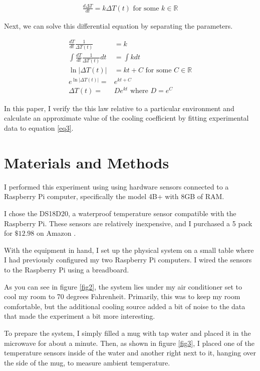 \documentclass[12pt]{article}
\newcommand{\reals}{\mathbb{R}}
\begin{document}
\begin{align} \label{eq1}
	\frac{d\Delta T}{dt} = k\Delta T(t) \textrm{ for some $k \in \reals$}
\end{align}

Next, we can solve this differential equation by separating the parameters.

\begin{align} \label{eq2}
	\frac{dT}{dt}\frac{1}{\Delta T(t)} & = k \\
	\int \frac{dT}{dt}\frac{1}{\Delta T(t)} dt & = \int k dt \\
	\ln|\Delta T(t)| & = kt + C \textrm{ for some $C \in \reals$} \\
	e^{\ln | \Delta T(t) | } = & e^{kt + C} \\
	\label{eq3}
	\Delta T(t) = & De^{kt} \textrm{ where $D = e^C$ }
\end{align}

In this paper, I verify the this law
relative to a particular environment
and calculate an approximate value of the cooling coefficient
by fitting experimental data to equation \ref{eq3}.

\section{Materials and Methods}

I performed this experiment using
using hardware sensors
connected to a Raspberry Pi computer,
specifically the model 4B+ with 8GB of RAM.

I chose the DS18D20,
a waterproof temperature sensor compatible with the Raspberry Pi.
These sensors are relatively inexpensive,
and I purchased a 5 pack for $\$12.98$ on Amazon \citep{Amazon}.

With the equipment in hand,
I set up the physical system
on a small table
where I had previously configured
my two Raspberry Pi computers.
I wired the sensors to the Raspberry Pi using
a breadboard.

As you can see in figure \ref{fig2},
the system lies under my air conditioner
set to cool my room to 70 degrees Fahrenheit.
Primarily, this was to keep my room comfortable,
but the additional cooling source added
a bit of noise to the data
that made the experiment a bit more interesting.

To prepare the system,
I simply filled a mug with tap water
and placed it in the microwave
for about a minute.
Then, as shown in figure \ref{fig3},
I placed one of the temperature sensors
inside of the water
and another right next to it,
hanging over the side of the mug,
to measure ambient temperature.
\end{document}
